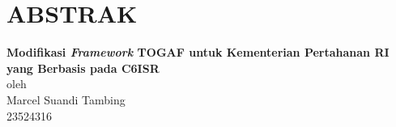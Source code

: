 \chapter*{ABSTRAK}

\begin{center}

    \textbf{Modifikasi \textit{Framework} TOGAF untuk Kementerian Pertahanan RI\\yang Berbasis pada C6ISR} \\
    \vspace{0.4cm}
    oleh \\
    \vspace{0.4cm}
    Marcel Suandi Tambing\\
    23524316\\
\end{center}


